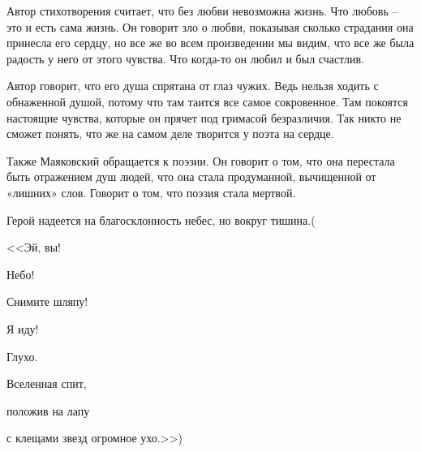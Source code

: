 \documentclass[a4paper,12pt]{article}
\begin{document}
	Автор стихотворения считает, что без любви невозможна жизнь. Что любовь – это и есть сама жизнь. Он говорит зло о любви, показывая сколько страдания она принесла его сердцу, но все же во всем произведении мы видим, что все же была радость у него от этого чувства. Что когда-то он любил и был счастлив.
	
	Автор говорит, что его душа спрятана от глаз чужих. Ведь нельзя ходить с обнаженной душой, потому что там таится все самое сокровенное. Там покоятся настоящие чувства, которые он прячет под гримасой безразличия. Так никто не сможет понять, что же на самом деле творится у поэта на сердце.
	
	Также Маяковский обращается к поэзии. Он говорит о том, что она перестала быть отражением душ людей, что она стала продуманной, вычищенной от «лишних» слов. Говорит о том, что поэзия стала мертвой.
	
	Герой надеется на благосклонность небес, но вокруг тишина.(
	
	<<Эй, вы!
	
	Небо!
	
	Снимите шляпу!
	
	Я иду!
	
	Глухо.
	
	Вселенная спит,
	
	положив на лапу
	
	с клещами звезд огромное ухо.>>)
	
\end{document}
